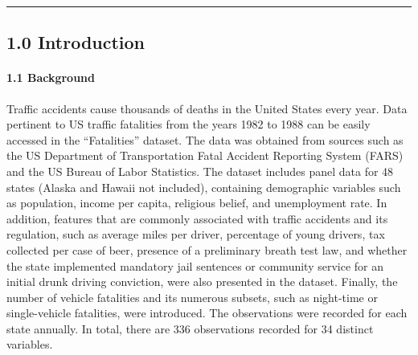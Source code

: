 \documentclass[]{article}
\let\oldparagraph\paragraph
\renewcommand{\paragraph}[1]{\oldparagraph{#1}\mbox{}}
\begin{document}
\begin{center}\rule{0.5\linewidth}{0.5pt}\end{center}

\hypertarget{introduction}{%
\subsection{1.0 Introduction}\label{introduction}}

\hypertarget{background}{%
\paragraph{1.1 Background}\label{background}}

Traffic accidents cause thousands of deaths in the United States every year. Data pertinent to US traffic fatalities from the years 1982 to 1988 can be easily accessed in the ``Fatalities'' dataset. The data was obtained from sources such as the US Department of Transportation Fatal Accident Reporting System (FARS) and the US Bureau of Labor Statistics. The dataset includes panel data for 48 states (Alaska and Hawaii not included), containing demographic variables such as population, income per capita, religious belief, and unemployment rate. In addition, features that are commonly associated with traffic accidents and its regulation, such as average miles per driver, percentage of young drivers, tax collected per case of beer, presence of a preliminary breath test law, and whether the state implemented mandatory jail sentences or community service for an initial drunk driving conviction, were also presented in the dataset. Finally, the number of vehicle fatalities and its numerous subsets, such as night-time or single-vehicle fatalities, were introduced. The observations were recorded for each state annually. In total, there are 336 observations recorded for 34 distinct variables.
\end{document}
